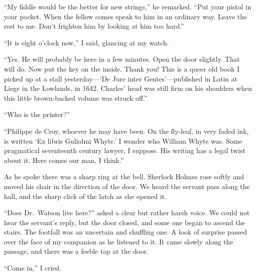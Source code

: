 \documentclass[12pt,english,oneside]{book}
\newcommand{\mdsh}[1]{\mbox{#1}\linebreak[1]}
\begin{document}
{}``My fiddle would be the better for new strings,'' he remarked.
{}``Put your pistol in your pocket. When the fellow comes speak to
him in an ordinary way. Leave the rest to me. Don't frighten him by
looking at him too hard.''

{}``It is eight o'clock now,'' I said, glancing at my watch.

{}``Yes. He will probably be here in a few minutes. Open the door
slightly. That will do. Now put the key on the inside. Thank you!
This is a queer old book I picked up at a stall yesterday\mdsh{---}`De
Jure inter Gentes'\mdsh{---}published in Latin at Liege in the Lowlands,
in 1642. Charles' head was still firm on his shoulders when this little
brown-backed volume was struck off.''

{}``Who is the printer?''

{}``Philippe de Croy, whoever he may have been. On the fly-leaf,
in very faded ink, is written `Ex libris Guliolmi Whyte.' I wonder
who William Whyte was. Some pragmatical seventeenth century lawyer,
I suppose. His writing has a legal twist about it. Here comes our
man, I think.''

As he spoke there was a sharp ring at the bell. Sherlock Holmes rose
softly and moved his chair in the direction of the door. We heard
the servant pass along the hall, and the sharp click of the latch
as she opened it.

{}``Does Dr.\ Watson live here?'' asked a clear but rather harsh
voice. We could not hear the servant's reply, but the door closed,
and some one began to ascend the stairs. The footfall was an uncertain
and shuffling one. A look of surprise passed over the face of my companion
as he listened to it. It came slowly along the passage, and there
was a feeble tap at the door.

{}``Come in,'' I cried.
\end{document}

